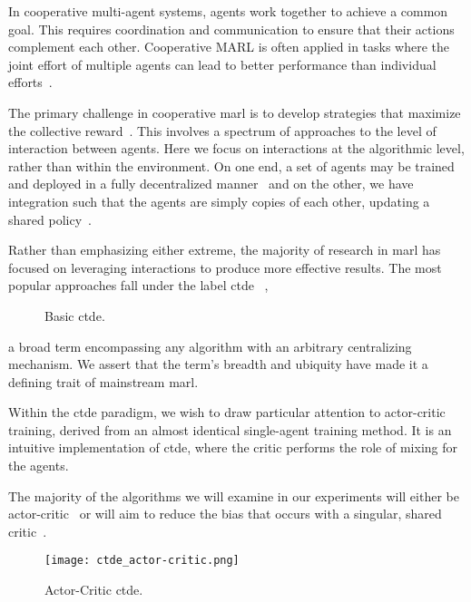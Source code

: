 In cooperative multi-agent systems, agents work together to achieve a 
common goal. This requires coordination and communication to ensure that 
their actions complement each other. Cooperative MARL is often applied 
in tasks where the joint effort of multiple agents can lead to better 
performance than individual efforts~\cite{littman1994}.

The primary challenge in cooperative \gls{marl} is to develop 
strategies that maximize the collective reward~\cite{albrecht2024}. 
This involves a spectrum of approaches to the level of interaction 
between agents. Here we focus on interactions at the algorithmic level, 
rather than within the environment. On one end, 
a set of agents may be trained and deployed in a fully decentralized
manner~\cite{li2023d} and on the other,
we have integration such that the agents are simply copies of each other,
updating a shared policy~\cite{zheng2017}.

Rather than emphasizing either extreme, the majority of research in \gls{marl} 
has focused on leveraging interactions to produce more effective results. 
The most popular approaches fall under the label \gls{ctde}~%
\cite{foerster2017,rashid2018,fotouhi2019,lowe2020,pan2021,%
papoudakis2021,li2023d,zhou2023}, 
%
\begin{wrapfigure}[9]{R}{0.4\textwidth}
    \vspace*{-2.5em}
    \centering
    
    \caption{Basic \gls{ctde}.}
    \label{fig:basic_ctde}
\end{wrapfigure}
%
a broad term encompassing any algorithm with an arbitrary centralizing 
mechanism. We assert that the term's breadth and ubiquity have made it 
a defining trait of mainstream \gls{marl}.

Within the \gls{ctde} paradigm, we wish to draw particular attention to 
actor-critic training, derived from an almost identical single-agent 
training method. It is an intuitive implementation of \gls{ctde}, 
where the critic performs the role of mixing for the agents.

The majority of the algorithms we will examine in our experiments 
will either be actor-critic~\cite{foerster2017,lowe2020,li2023c} 
or will aim to reduce the bias that occurs with a singular, 
shared critic~\cite{rashid2018,ackermann2019,li2023d,zhou2023}.

\begin{wrapfigure}[9]{R}{0.4\textwidth}
    \vspace*{-1em}
    \centering
    \texttt{[image: ctde\_actor-critic.png]}
    \caption{Actor-Critic \gls{ctde}.}
    \label{fig:ctde_actor-critic}
\end{wrapfigure}

